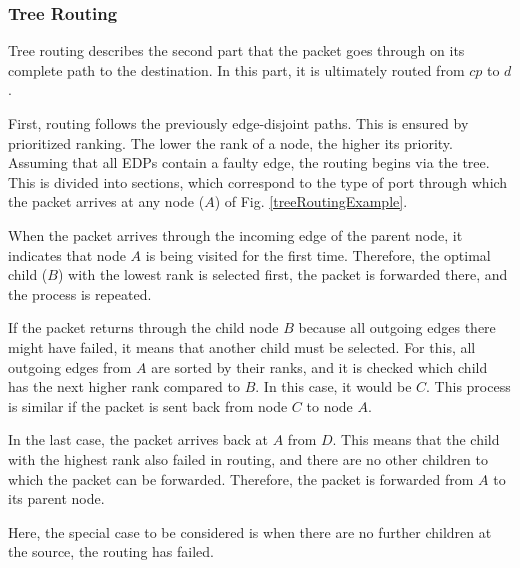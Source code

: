 \documentclass[conference]{IEEEtran}
\begin{document}
\subsubsection{Tree Routing}
\label{routingTree}
Tree routing describes the second part that the packet goes through on its complete path to the destination. In this part, it is ultimately routed from $cp$ to $d$.

First, routing follows the previously edge-disjoint paths. This is ensured by prioritized ranking.
The lower the rank of a node, the higher its priority.
Assuming that all EDPs contain a faulty edge, the routing begins via the tree. This is divided into sections, which correspond to the type of port through which the packet arrives at any node ($A$) of Fig. \ref{treeRoutingExample}.

When the packet arrives through the incoming edge of the parent node, it indicates that node $A$ is being visited for the first time. Therefore, the optimal child ($B$) with the lowest rank is selected first, the packet is forwarded there, and the process is repeated.

If the packet returns through the child node $B$ because all outgoing edges there might have failed, it means that another child must be selected. For this, all outgoing edges from $A$ are sorted by their ranks, and it is checked which child has the next higher rank compared to $B$. In this case, it would be $C$. This process is similar if the packet is sent back from node $C$ to node $A$.

In the last case, the packet arrives back at $A$ from $D$. This means that the child with the highest rank also failed in routing, and there are no other children to which the packet can be forwarded. Therefore, the packet is forwarded from $A$ to its parent node.

Here, the special case to be considered is when there are no further children at the source, the routing has failed.
\end{document}
